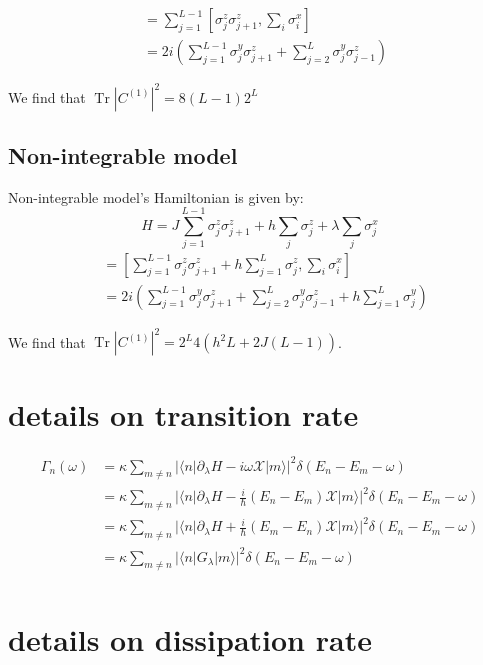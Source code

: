 \documentclass[11pt,a4paper]{article}
\DeclareMathOperator{\Tr}{Tr}
\begin{document}
\begin{align*}
[H,\partial_{\lambda}H] & = \sum_{j=1}^{L-1} [\sigma_j^z \sigma_{j+1}^z , \sum_{i} \sigma_i^x]  \\
&= 2i \left(\sum_{j=1}^{L-1} \sigma_j^y \sigma_{j+1}^z + \sum_{j=2}^{L} \sigma_j^y \sigma_{j-1}^z\right)
\end{align*}

We find that $\Tr |C^{(1)}|^2 = 8 (L-1)2^L$ 

\subsection{Non-integrable model}
Non-integrable model's Hamiltonian is given by: 
\begin{equation}
H= J \sum_{j=1}^{L-1} \sigma_j^z \sigma_{j+1}^z + h\sum_{j} \sigma_j^z +\lambda \sum_{j} \sigma_j^x 
\end{equation}
\begin{align*}
[H,\partial_{\lambda}H] & =  [\sum_{j=1}^{L-1} \sigma_j^z \sigma_{j+1}^z + h\sum_{j=1}^{L} \sigma_j^z, \sum_{i} \sigma_i^x]  \\
&= 2i \left(\sum_{j=1}^{L-1} \sigma_j^y \sigma_{j+1}^z + \sum_{j=2}^{L} \sigma_j^y \sigma_{j-1}^z + h \sum_{j=1}^{L}\sigma_j^y \right) 
\end{align*}


We find that $\Tr |C^{(1)}|^2 = 2^L 4(h^2 L + 2J(L-1))$. 
 


\section{details on transition rate}\label{sec.transition_rate}
\begin{align}
 \Gamma_n (\omega) &= \kappa  \sum_{m \neq n} |\langle n | \partial_{\lambda} H - i \omega \mathcal{X} | m \rangle |^2 \delta(E_n-E_m- \omega) \\
 &= \kappa  \sum_{m \neq n} |\langle n | \partial_{\lambda} H - \frac{i}{\hbar} (E_n-E_m)\mathcal{X} | m \rangle |^2 \delta(E_n-E_m- \omega) \\
 &= \kappa  \sum_{m \neq n} |\langle n | \partial_{\lambda} H + \frac{i}{\hbar} (E_m-E_n)\mathcal{X} | m \rangle |^2 \delta(E_n-E_m- \omega) \\
 &= \kappa  \sum_{m \neq n} |\langle n | G_{\lambda} | m \rangle |^2 \delta(E_n-E_m- \omega) \\
\end{align}

\section{details on dissipation rate}\label{sec.dissipation_rate}
\end{document}
